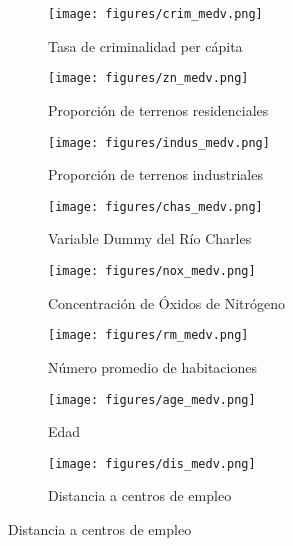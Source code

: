 \documentclass[12pt,a4paper]{article}
\begin{document}
\begin{figure}[H]
\centering
\begin{subfigure}[t]{0.24\textwidth}
    \centering
    \texttt{[image: figures/crim\_medv.png]}
    \caption{\footnotesize Tasa de criminalidad per cápita}
    \label{fig:modelo_crim}
\end{subfigure}
\hfill
\begin{subfigure}[t]{0.24\textwidth}
    \centering
    \texttt{[image: figures/zn\_medv.png]}
    \caption{\footnotesize Proporción de terrenos residenciales}
    \label{fig:modelo_zn}
\end{subfigure}
\hfill
\begin{subfigure}[t]{0.24\textwidth}
    \centering
    \texttt{[image: figures/indus\_medv.png]}
    \caption{\footnotesize Proporción de terrenos industriales}
    \label{fig:modelo_indus}
\end{subfigure}
\hfill
\begin{subfigure}[t]{0.24\textwidth}
    \centering
    \texttt{[image: figures/chas\_medv.png]}
    \caption{\footnotesize Variable Dummy del Río Charles}
    \label{fig:modelo_chas}
\end{subfigure}

\vspace{0.2cm}

\begin{subfigure}[t]{0.24\textwidth}
    \centering
    \texttt{[image: figures/nox\_medv.png]}
    \caption{\footnotesize Concentración de Óxidos de Nitrógeno}
    \label{fig:modelo_nox}
\end{subfigure}
\hfill
\begin{subfigure}[t]{0.24\textwidth}
    \centering
    \texttt{[image: figures/rm\_medv.png]}
    \caption{\footnotesize Número promedio de habitaciones}
    \label{fig:modelo_rm}
\end{subfigure}
\hfill
\begin{subfigure}[t]{0.24\textwidth}
    \centering
    \texttt{[image: figures/age\_medv.png]}
    \caption{\footnotesize Edad}
    \label{fig:modelo_age}
\end{subfigure}
\hfill
\begin{subfigure}[t]{0.24\textwidth}
    \centering
    \texttt{[image: figures/dis\_medv.png]}
    \caption{\footnotesize Distancia a centros de empleo}
    \label{fig:modelo_dis}
\end{subfigure}


\end{figure}
\end{document}
